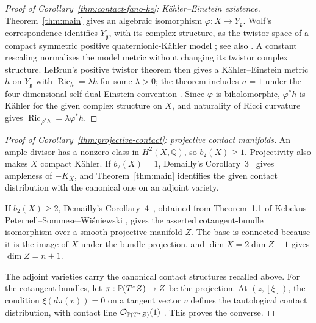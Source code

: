 \begin{proof}[Proof of Corollary~\ref{thm:contact-fano-ke}: K\"ahler--Einstein existence]
Theorem~\ref{thm:main} gives an algebraic isomorphism
$\varphi:X\to Y_{\mathfrak g}$. Wolf's correspondence identifies
$Y_{\mathfrak g}$, with its complex structure, as the twistor space of
a compact symmetric positive quaternionic-K\"ahler model
\cite{Wolf1965}; see also \cite[Section~2]{LeBrun1995}.
A constant rescaling normalizes the model metric without changing its
twistor complex structure. LeBrun's positive twistor theorem then gives
a K\"ahler--Einstein metric $h$ on $Y_{\mathfrak g}$ with
$\operatorname{Ric}_h=\lambda h$ for some $\lambda>0$; the theorem
includes $n=1$ under the four-dimensional self-dual Einstein convention
\cite[Theorem~2.1 and Definition~2.3]{LeBrun1995}.
Since $\varphi$ is biholomorphic, $\varphi^*h$ is K\"ahler for the
given complex structure on $X$, and naturality of Ricci curvature gives
$\operatorname{Ric}_{\varphi^*h}=\lambda\varphi^*h$.
\end{proof}

\begin{proof}[Proof of Corollary~\ref{thm:projective-contact}: projective contact manifolds]
An ample divisor has a nonzero class in $H^2(X,\mathbb Q)$, so
$b_2(X)\geq1$. Projectivity also makes $X$ compact K\"ahler. If
$b_2(X)=1$, Demailly's Corollary~3~\cite{Demailly2000} gives ampleness
of $-K_X$, and Theorem~\ref{thm:main} identifies the given contact
distribution with the canonical one on an adjoint variety.

If $b_2(X)\geq2$, Demailly's Corollary~4~\cite{Demailly2000}, obtained
from Theorem~1.1 of Kebekus--Peternell--Sommese--Wi\'sniewski
\cite{KPSW2000}, gives the asserted cotangent-bundle isomorphism over
a smooth projective manifold $Z$. The base is connected because it is
the image of $X$ under the bundle projection, and
$\dim X=2\dim Z-1$ gives $\dim Z=n+1$.

The adjoint varieties carry the canonical contact structures recalled
above. For the cotangent bundles, let $\pi:\mathbb P(T^*Z)\to Z$ be the
projection. At $(z,[\xi])$, the condition
$\xi(d\pi(v))=0$ on a tangent vector $v$ defines the tautological contact
distribution, with contact line $\mathcal O_{\mathbb P(T^*Z)}(1)$
\cite[Section~1]{Demailly2000}. This proves the converse.
\end{proof}
